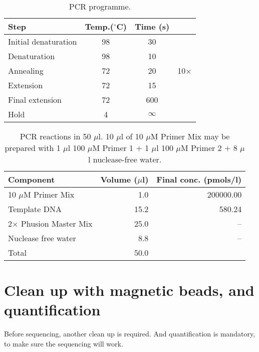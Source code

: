 \documentclass[a4paper,12pt]{article}
\begin{document}
\begin{table}
 \begin{center}
  \caption{PCR programme.}\label{tau:pcrprogramme}
  \vspace*{0.3cm}
  \begin{tabular}{lccl}
   \toprule
Step&Temp.($^\circ$C)&Time (s)&\\
   \midrule
Initial denaturation&98&30&\\
Denaturation&98&\multicolumn{1}{c|}{10}&\\
Annealing&72&\multicolumn{1}{c|}{20}&10$\times$\\
Extension&72&\multicolumn{1}{c|}{15}&\\
Final extension&72&600&\\
Hold&4&$\infty$&\\
   \bottomrule
  \end{tabular}
 \end{center}
\end{table}

\begin{table}
\begin{center}
\caption{PCR reactions in 50 $\mu$l. 10 $\mu$l of 10 $\mu$M Primer Mix may be prepared with 1 $\mu$l 100 $\mu$M Primer 1 $+$ 1 $\mu$l 100 $\mu$M Primer 2 $+$ 8 $\mu$l nuclease-free water.}\label{tau:PCR}
\vspace*{0.2cm}
\begin{tabular}{lrr}
\toprule
Component&Volume ($\mu$l)&Final conc. (pmols/l)\\
\midrule
10 $\mu$M Primer Mix&1.0&200000.00\\
Template DNA&15.2&580.24\\
2$\times$ Phusion Master Mix&25.0&--\\
Nuclease free water&8.8&--\\
\midrule
Total&50.0&\\
\bottomrule
\end{tabular}
\end{center}
\end{table}


\section{Clean up with magnetic beads, and quantification}
Before sequencing, another clean up is required. And quantification is mandatory, to make sure the sequencing will work.



\end{document}
